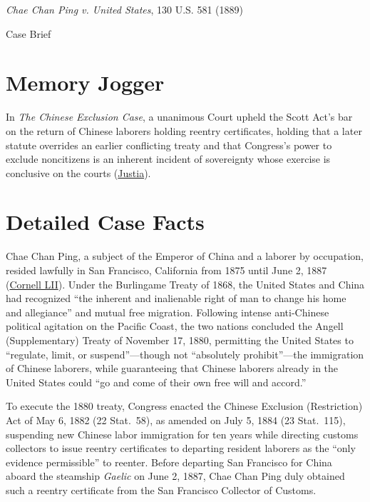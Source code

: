 \documentclass[12pt]{article}
\begin{document}
\begin{center}
{\LARGE \textit{Chae Chan Ping v. United States}, 130 U.S. 581 (1889)\par}
\vspace{0.8em}
{\large Case Brief\par}
\end{center}
\vspace{1em}

\section{Memory Jogger}
In \textit{The Chinese Exclusion Case}, a unanimous Court upheld the Scott Act's bar on the return of Chinese laborers holding reentry certificates, holding that a later statute overrides an earlier conflicting treaty and that Congress's power to exclude noncitizens is an inherent incident of sovereignty whose exercise is conclusive on the courts (\href{https://supreme.justia.com/cases/federal/us/130/581/}{Justia}).

\section{Detailed Case Facts}
Chae Chan Ping, a subject of the Emperor of China and a laborer by occupation, resided lawfully in San Francisco, California from 1875 until June 2, 1887 (\href{https://www.law.cornell.edu/supremecourt/text/130/581}{Cornell LII}). Under the Burlingame Treaty of 1868, the United States and China had recognized ``the inherent and inalienable right of man to change his home and allegiance'' and mutual free migration. Following intense anti-Chinese political agitation on the Pacific Coast, the two nations concluded the Angell (Supplementary) Treaty of November 17, 1880, permitting the United States to ``regulate, limit, or suspend''---though not ``absolutely prohibit''---the immigration of Chinese laborers, while guaranteeing that Chinese laborers already in the United States could ``go and come of their own free will and accord.''

To execute the 1880 treaty, Congress enacted the Chinese Exclusion (Restriction) Act of May 6, 1882 (22 Stat.\ 58), as amended on July 5, 1884 (23 Stat.\ 115), suspending new Chinese labor immigration for ten years while directing customs collectors to issue reentry certificates to departing resident laborers as the ``only evidence permissible'' to reenter. Before departing San Francisco for China aboard the steamship \textit{Gaelic} on June 2, 1887, Chae Chan Ping duly obtained such a reentry certificate from the San Francisco Collector of Customs.
\end{document}
